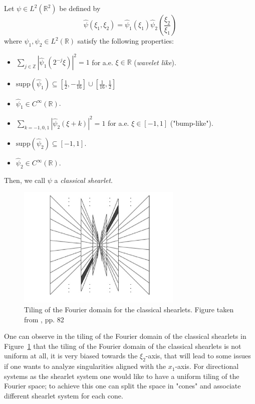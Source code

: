\begin{defn}
\label{def:classical_shearlets}
Let $\psi\in L^2(\mathbb{R}^2)$ be defined by
$$
\hat{\psi}(\xi_1,\xi_2)=\hat{\psi}_1(\xi_1)\hat{\psi}_2\left(\frac{\xi_2}{\xi_1}\right)
$$
where $\psi_1,\psi_2\in L^2(\mathbb{R})$ satisfy the following properties:
\begin{itemize}
\item $\sum_{j\in\mathbb{Z}} |\hat{\psi}_1(2^{-j}\xi)|^2=1$ for a.e. $\xi\in\mathbb{R}$ (\textit{wavelet like}).
\item $\text{supp}(\hat{\psi}_1)\subseteq \left[ \frac{1}{2},-\frac{1}{16}\right]\cup\left[\frac{1}{16},\frac{1}{2}\right]$
\item $\hat{\psi}_1\in C^{\infty}(\mathbb{R})$.
\item $\sum_{k=-1,0,1}|\hat{\psi}_2(\xi+k)|^2=1$ for a.e. $\xi\in [-1,1]$ ("bump-like").
\item $\text{supp}(\hat{\psi}_2)\subseteq [-1,1]$.
\item $\hat{\psi}_2\in C^{\infty}(\mathbb{R})$.
\end{itemize}
Then, we call $\psi$ a \textit{classical shearlet}.
\end{defn}

\begin{figure}[!tbp]
  \centering
   \includegraphics[width=0.7\textwidth]{./Diagrams/tiling_nocone.jpg}
    \caption{Tiling of the Fourier domain for the classical shearlets. Figure taken from \cite{Gitta-notes}, pp. 82}
  \label{fig:tiling_nocone}

\end{figure}

One can observe in  the tiling of the Fourier domain of the classical shearlets in Figure~\ref{fig:tiling_nocone} that the tiling of the Fourier domain of the classical shearlets is not uniform at all, it is very biased towards the $\xi_2$-axis, that will lead to some issues if one wants to analyze singularities aligned with the $x_1$-axis. For directional systems as the shearlet system one would like to have a uniform tiling of the Fourier space; to achieve this one can split the space in "cones" and associate different shearlet system for each cone. 

